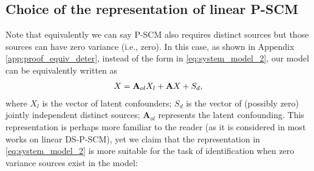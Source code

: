 \documentclass[12pt]{article}
\newcommand{\bA}{\mathbf{A}}
\newcommand{\bB}{\mathbf{B}}
\begin{document}
\vspace{-4mm}
\subsection{Choice of the representation of linear P-SCM}
\vspace{-2mm}
Note that equivalently we can say P-SCM also requires distinct sources but those sources can have zero variance (i.e., zero). In this case, as shown in Appendix \ref{app:proof_equiv_deter}, instead of the form in \eqref{eq:system_model_2}, our model can be equivalently written 
as 
\vspace{-3mm}
\begin{equation}\label{eq:ds_scm_deterministic}
\begin{aligned}
X=\bA_{ol}X_l+\bA X+S_d,
\end{aligned} 
\vspace{-3mm}
\end{equation}
where
$X_l$ is the vector of latent confounders; $S_d$ is the vector of (possibly zero) jointly independent distinct sources; $\bA_{ol}$ represents the latent confounding.
This representation is perhaps more familiar to the reader (as it is considered in most works on linear DS-P-SCM), yet we claim that the representation in \eqref{eq:system_model_2} is more suitable for the task of identification when zero variance sources exist in the model:
\end{document}
